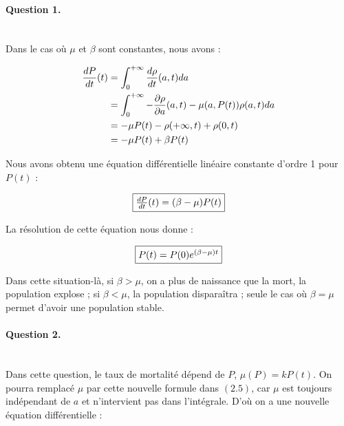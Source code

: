 \documentclass[paper=a4, french]{scrartcl} %
\numberwithin{equation}{section} %
\numberwithin{figure}{section} %
\numberwithin{table}{section} %
\begin{document}

\paragraph{\textbf{Question 1.}}
~\\

Dans le cas où $\mu$ et $\beta$ sont constantes, nous avons :

\begin{equation*}
\begin{aligned}
{dP \over dt}(t)  & =  {\int_{0}^{+\infty}{d\rho \over dt}(a,t)da} \\
& =  {\int_{0}^{+\infty} - \frac{\partial \rho}{\partial a}(a,t) - \mu(a,P(t))\rho(a,t) da} \\
& =  -\mu P(t) - \rho (+ \infty,t) + \rho (0,t) \\
& = -\mu P(t) + \beta P(t) \\
\end{aligned}
\end{equation*}

Nous avons obtenu une équation différentielle linéaire constante d\rq{}ordre 1 pour $P(t)$ :

\begin{equation}
\fbox{${dP \over dt}(t) = (\beta - \mu)P(t)$}
\end{equation}

La résolution de cette équation nous donne :

\begin{equation}
\fbox{$P(t) = P(0) e^{(\beta - \mu)t}$}
\end{equation}

Dans cette situation-là, si $\beta > \mu$, on a plus de naissance que la mort, la population explose ; si $\beta < \mu$, la population disparaîtra ; seule le cas où $\beta = \mu$ permet d\rq{}avoir une population stable.


\paragraph{\textbf{Question 2.}}
~\\

Dans cette question, le taux de mortalité dépend de $P$, $\mu (P) = kP(t)$. On pourra remplacé $\mu$ par cette nouvelle formule dans $(2.5)$, car $\mu$ est toujours indépendant de $a$ et n\rq{}intervient pas dans l\rq{}intégrale. D\rq{}où on a une nouvelle équation différentielle :
\end{document}
